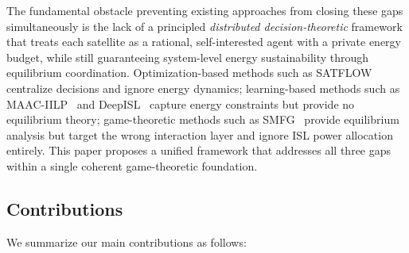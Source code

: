 \documentclass[journal]{IEEEtran}
\begin{document}

The fundamental obstacle preventing existing approaches from closing these gaps simultaneously is the lack of a principled \emph{distributed decision-theoretic} framework that treats each satellite as a rational, self-interested agent with a private energy budget, while still guaranteeing system-level energy sustainability through equilibrium coordination. Optimization-based methods such as SATFLOW~\cite{cen2024satflow} centralize decisions and ignore energy dynamics; learning-based methods such as MAAC-IILP~\cite{li2023energy} and DeepISL~\cite{li2023deepisl} capture energy constraints but provide no equilibrium theory; game-theoretic methods such as SMFG~\cite{wang2023smfg} provide equilibrium analysis but target the wrong interaction layer and ignore ISL power allocation entirely. This paper proposes a unified framework that addresses all three gaps within a single coherent game-theoretic foundation.

\subsection{Contributions}

We summarize our main contributions as follows:
\end{document}
